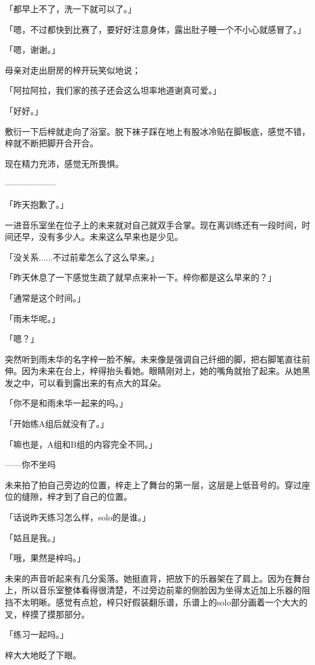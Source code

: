 \documentclass[UTF8]{ctexart}
\begin{document}
    「都早上不了，洗一下就可以了。」

    「嗯，不过都快到比赛了，要好好注意身体，露出肚子睡一个不小心就感冒了。」

    「嗯，谢谢。」

    母亲对走出厨房的梓开玩笑似地说；

    「阿拉阿拉，我们家的孩子还会这么坦率地道谢真可爱。」

    「好好。」

    敷衍一下后梓就走向了浴室。脱下袜子踩在地上有股冰冷贴在脚板底，感觉不错，梓就不断把脚开合开合。

    现在精力充沛，感觉无所畏惧。

    ——————

    「昨天抱歉了。」

    一进音乐室坐在位子上的未来就对自己就双手合掌。现在离训练还有一段时间，时间还早，没有多少人。未来这么早来也是少见。

    「没关系......不过前辈怎么了这么早来。」

    「昨天休息了一下感觉生疏了就早点来补一下。梓你都是这么早来的？」

    「通常是这个时间。」

    「雨未华呢。」

    「嗯？」

    突然听到雨未华的名字梓一脸不解。未来像是强调自己纤细的脚，把右脚笔直往前伸。因为未来在台上，梓得抬头看她。眼睛刚对上，她的嘴角就抬了起来。从她黑发之中，可以看到露出来的有点大的耳朵。

    「你不是和雨未华一起来的吗。」

    「开始练A组后就没有了。」

    「嘛也是，A组和B组的内容完全不同。」

    ——你不坐吗

    未来拍了拍自己旁边的位置，梓走上了舞台的第一层，这层是上低音号的。穿过座位的缝隙，梓才到了自己的位置。

    「话说昨天练习怎么样，solo的是谁。」

    「姑且是我。」

    「哦，果然是梓吗。」

    未来的声音听起来有几分奚落。她挺直背，把放下的乐器架在了肩上。因为在舞台上，所以音乐室整体看得很清楚，不过旁边前辈的侧脸因为坐得太近加上乐器的阻挡不太明晰。感觉有点尬，梓只好假装翻乐谱，乐谱上的solo部分画着一个大大的叉，梓摸了摸那部分。

    「练习一起吗。」

    梓大大地眨了下眼。
\end{document}
